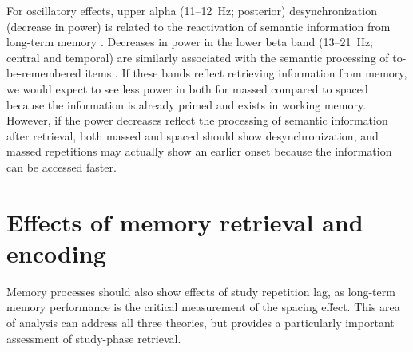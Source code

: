

For oscillatory effects, upper alpha (11--12~Hz; posterior) desynchronization (decrease in power) is related to the reactivation of semantic information from long-term memory \cite{Klim1999,KlimEtal2005}.  Decreases in power in the lower beta band (13--21~Hz; central and temporal) are similarly associated with the semantic processing of to-be-remembered items \cite{FellEtal2013,HansEtal2012,HansEtal2011a}.  If these bands reflect retrieving information from memory, we would expect to see less power in both for massed compared to spaced because the information is already primed and exists in working memory.  However, if the power decreases reflect the processing of semantic information after retrieval, both massed and spaced should show desynchronization, and massed repetitions may actually show an earlier onset because the information can be accessed faster.



\section{Effects of memory retrieval and encoding}

Memory processes should also show effects of study repetition lag, as long-term memory performance is the critical measurement of the spacing effect.  This area of analysis
can address all three theories, but provides a particularly important assessment of study-phase retrieval.



